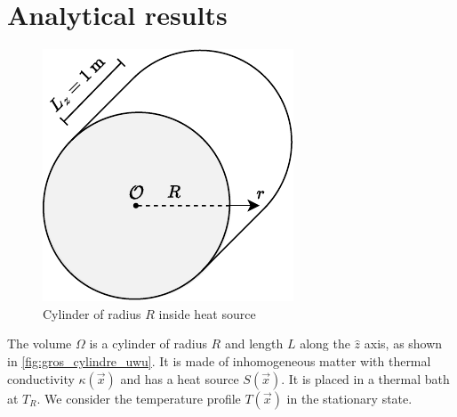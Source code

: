 \section{Analytical results}

\begin{figure}
    \vspace*{-1cm}
    \centering
    \includegraphics[width=\linewidth]{figures/cylindre.pdf}
    \caption{Cylinder of radius \(R\) inside heat source}
    \label{fig:gros_cylindre_uwu}
    \vspace*{1cm}
\end{figure}
The volume $\Omega$ is a cylinder of radius $R$ and length $L$ along the $\hat{z}$ axis, as shown in \autoref{fig:gros_cylindre_uwu}. It is made of inhomogeneous matter with thermal conductivity $\kappa(\vec{x})$ and has a heat source $S(\vec{x})$. It is placed in a thermal bath at $T_R$. We consider the temperature profile $T(\vec{x})$ in the stationary state.

